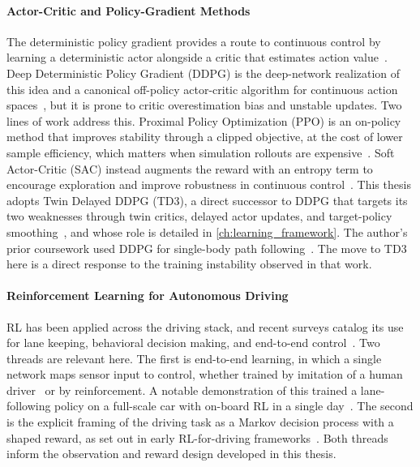 \paragraph{Actor-Critic and Policy-Gradient Methods}
The deterministic policy gradient provides a route to continuous control by learning a deterministic actor alongside a critic that estimates action value~\cite{silver2014dpg}. Deep Deterministic Policy Gradient (DDPG) is the deep-network realization of this idea and a canonical off-policy actor-critic algorithm for continuous action spaces~\cite{lillicrap2016ddpg}, but it is prone to critic overestimation bias and unstable updates. Two lines of work address this. Proximal Policy Optimization (PPO) is an on-policy method that improves stability through a clipped objective, at the cost of lower sample efficiency, which matters when simulation rollouts are expensive~\cite{schulman2017ppo}. Soft Actor-Critic (SAC) instead augments the reward with an entropy term to encourage exploration and improve robustness in continuous control~\cite{haarnoja2018sac}. This thesis adopts Twin Delayed DDPG (TD3), a direct successor to DDPG that targets its two weaknesses through twin critics, delayed actor updates, and target-policy smoothing~\cite{fujimoto2018td3}, and whose role is detailed in \cref{ch:learning_framework}. The author's prior coursework used DDPG for single-body path following~\cite{tymkow2024me780}. The move to TD3 here is a direct response to the training instability observed in that work.

\paragraph{Reinforcement Learning for Autonomous Driving}
RL has been applied across the driving stack, and recent surveys catalog its use for lane keeping, behavioral decision making, and end-to-end control~\cite{kiran2022survey}. Two threads are relevant here. The first is end-to-end learning, in which a single network maps sensor input to control, whether trained by imitation of a human driver~\cite{codevilla2018cil} or by reinforcement. A notable demonstration of this trained a lane-following policy on a full-scale car with on-board RL in a single day~\cite{kendall2019learningdrive}. The second is the explicit framing of the driving task as a Markov decision process with a shaped reward, as set out in early RL-for-driving frameworks~\cite{sallab2017framework}. Both threads inform the observation and reward design developed in this thesis.

